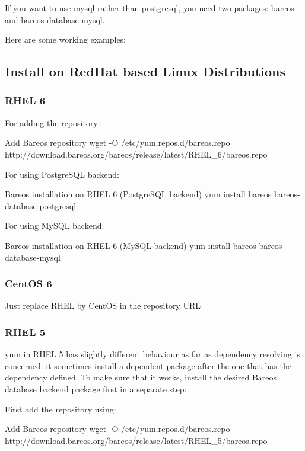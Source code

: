 If you want to use mysql rather than postgresql, you need two packages: bareos and bareos-database-mysql.

Here are some working examples:

\subsection{Install on RedHat based Linux Distributions}
\subsubsection{RHEL 6}

For adding the repository:
\begin{commands}{Add Bareos repository}
wget -O /etc/yum.repos.d/bareos.repo http://download.bareos.org/bareos/release/latest/RHEL_6/bareos.repo
\end{commands}

For using PostgreSQL backend:
\begin{commands}{Bareos installation on RHEL 6 (PostgreSQL backend)}
yum install bareos bareos-database-postgresql
\end{commands}

For using MySQL backend:
\begin{commands}{Bareos installation on RHEL 6 (MySQL backend)}
yum install bareos bareos-database-mysql
\end{commands}

\subsubsection{CentOS 6}

Just replace RHEL by CentOS in the repository URL

\subsubsection{RHEL 5}

yum in RHEL 5 has slightly different behaviour as far as dependency resolving is concerned: it sometimes install a dependent package after the one that has the dependency defined. To make sure that it works, install the desired Bareos database backend package first in a separate step:

First add the repository using:
\begin{commands}{Add Bareos repository}
wget -O /etc/yum.repos.d/bareos.repo http://download.bareos.org/bareos/release/latest/RHEL_5/bareos.repo
\end{commands}

